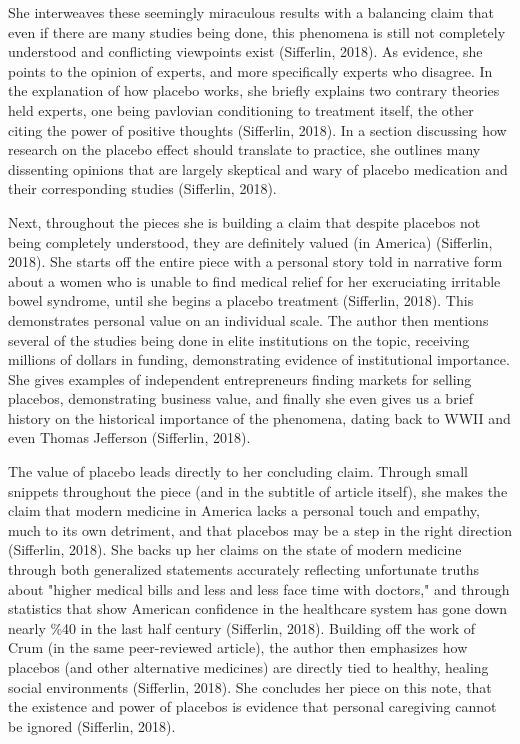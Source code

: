 \documentclass[a4paper, 10pt]{article}
\begin{document}
She interweaves these seemingly miraculous results with a balancing claim that even if there are many studies being done, this phenomena is still not completely understood and conflicting viewpoints exist  (Sifferlin, 2018). As evidence, she points to the opinion of experts, and more specifically experts who disagree. In the explanation of how placebo works, she briefly explains two contrary theories held experts, one being pavlovian conditioning to treatment itself, the other citing the power of positive
 thoughts (Sifferlin, 2018). In a section discussing how research on the placebo effect should translate to practice, she outlines many dissenting opinions that are largely skeptical and wary of placebo medication and their corresponding studies (Sifferlin, 2018).

Next, throughout the pieces she is building a claim that despite placebos not being completely understood, they are definitely valued (in America) (Sifferlin, 2018). She starts off the entire piece with a personal story told in narrative form about a women who is unable to find medical relief for her excruciating irritable bowel syndrome, until she begins a placebo treatment (Sifferlin, 2018). This demonstrates personal value on an individual scale. The author then mentions several of the studies being done in elite institutions on
 the topic, receiving millions of dollars in funding, demonstrating evidence of institutional importance. She gives examples of independent entrepreneurs finding markets for selling placebos, demonstrating business value, and finally she even gives us a brief history on the historical importance of the phenomena, dating back to WWII and even Thomas Jefferson (Sifferlin, 2018).
	
	The value of placebo leads directly to her concluding claim. Through small snippets throughout the piece (and in the subtitle of article itself), she makes the claim that modern medicine in America lacks a personal touch and empathy, much to its own detriment, and that placebos may be a step in the right direction (Sifferlin, 2018). She backs up her claims on the state of modern medicine through both generalized statements accurately reflecting unfortunate truths about "higher medical bills and less and less face
 time with doctors," and through statistics that show American confidence in the healthcare system has gone down nearly \%40 in the last half century (Sifferlin, 2018). Building off the work of Crum (in the same peer-reviewed article), the author then emphasizes how placebos (and other alternative medicines) are directly tied to healthy, healing social environments (Sifferlin, 2018). She concludes her piece on this note, that the existence and power of placebos is evidence that personal caregiving cannot be ignored (Sifferlin, 2018).
\end{document}
